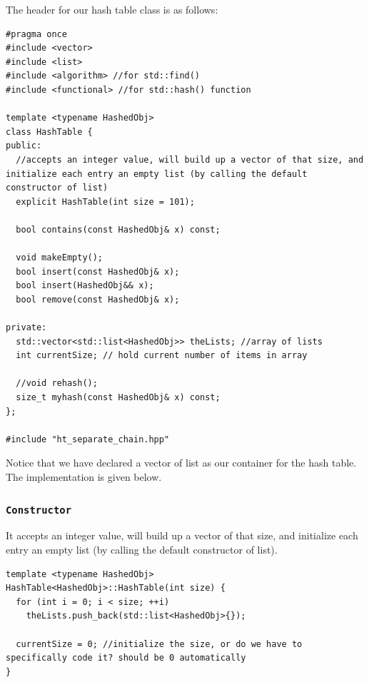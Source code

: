 \documentclass[12pt]{book}
\begin{document}
The header for our hash table class is as follows:
\begin{verbatim}
#pragma once
#include <vector>
#include <list>
#include <algorithm> //for std::find() 
#include <functional> //for std::hash() function

template <typename HashedObj>
class HashTable {
public:
  //accepts an integer value, will build up a vector of that size, and initialize each entry an empty list (by calling the default constructor of list)
  explicit HashTable(int size = 101);

  bool contains(const HashedObj& x) const;

  void makeEmpty();
  bool insert(const HashedObj& x);
  bool insert(HashedObj&& x);
  bool remove(const HashedObj& x);

private:
  std::vector<std::list<HashedObj>> theLists; //array of lists
  int currentSize; // hold current number of items in array

  //void rehash();
  size_t myhash(const HashedObj& x) const;
};

#include "ht_separate_chain.hpp"
\end{verbatim}

Notice that we have declared a vector of list as our container for the hash table. The implementation is given below.

\subsubsection{\texttt{Constructor}}
\label{sec:orgafb4459}
It accepts an integer value, will build up a vector of that size, and initialize each entry an empty list (by calling the default constructor of list).
\begin{verbatim}
template <typename HashedObj>
HashTable<HashedObj>::HashTable(int size) {
  for (int i = 0; i < size; ++i)
    theLists.push_back(std::list<HashedObj>{});

  currentSize = 0; //initialize the size, or do we have to specifically code it? should be 0 automatically
}
\end{verbatim}
\end{document}
